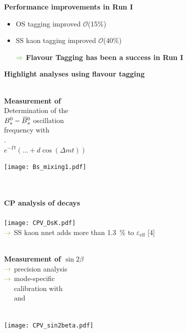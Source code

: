 {\begin{minipage}{0.474\boxwidth}
\begin{center}
\end{center}
\textbf{Performance improvements in Run I}
\begin{itemize}
\setlength\itemsep{0.01em}
\vspace{-0.3em}
\item OS tagging improved $\mathcal{O}$(15\%) 
\item SS kaon tagging improved $\mathcal{O}$(40\%)
\vspace{0.5em}
\setlength{\itemindent}{.14in}
\item[$\color{tu_gruen}\Rightarrow$] \textbf{Flavour Tagging has been a success in Run I}
\end{itemize}
\end{minipage}
\vspace{0.6em}
\hfill
\begin{minipage}{0.474\boxwidth}
\textbf{Highlight analyses using flavour tagging}\\
\vspace{-0.05em}\\
\parbox{0.190\boxwidth}{\textbf{\vspace{0.4em}Measurement of \dms}\\Determination of the\\ $B^0_s-\kern 0.18em\overline{\kern -0.18em B}{}^0_s$ oscillation\\ frequency with\\ \BsToDspi [3].\vspace{0.5em}\\$e^{-\Gamma t}\left(...+\!d\cos\left(\Delta mt\right)\right)$}
\hspace{0.25em}
\parbox{0.474\textwidth}{\texttt{[image: Bs\_mixing1.pdf]}}\\
\vspace{0.25em}\\
\textbf{CP analysis of \BsToDsK decays}\\
\vspace{-0.35em}\\
\texttt{[image: CPV\_DsK.pdf]}\\
${\color{tu_gruen}\rightarrow}$ SS kaon nnet adds more than 1.3\, \% to $\varepsilon_\text{eff}$ [4]\\
\vspace{-0.35em}\\
\parbox[c]{0.197\boxwidth}{\textbf{\vspace{0.4em}Measurement of $\sin2\beta$}\\${\color{tu_gruen}\rightarrow}$ precision analysis\\${\color{tu_gruen}\rightarrow}$ mode-specific\\ ${\color{white}\rightarrow}$ calibration with\\${\color{white}\rightarrow}$ \BuToJPsiKp and\\${\color{white}\rightarrow}$ \BdToJPsiKst [5]}
\hspace{0.25em}
\parbox[c]{0.474\textwidth}{\texttt{[image: CPV\_sin2beta.pdf]}}
\end{minipage}
\vspace{-0.5em}
}
